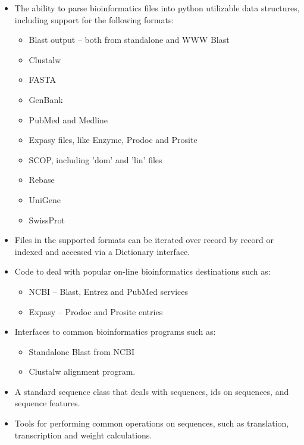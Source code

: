 \documentclass{report}
\begin{document}
\begin{itemize}
  \item The ability to parse bioinformatics files into python utilizable data structures, including support for the following formats:

  \begin{itemize}
    \item Blast output -- both from standalone and WWW Blast
    \item Clustalw
    \item FASTA
    \item GenBank
    \item PubMed and Medline
    \item Expasy files, like Enzyme, Prodoc and Prosite
    \item SCOP, including 'dom' and 'lin' files
    \item Rebase
    \item UniGene
    \item SwissProt
  \end{itemize}

  \item Files in the supported formats can be iterated over record by record or indexed and accessed via a Dictionary interface.

  \item Code to deal with popular on-line bioinformatics destinations such as:

  \begin{itemize}
    \item NCBI -- Blast, Entrez and PubMed services
    \item Expasy -- Prodoc and Prosite entries
  \end{itemize}

  \item Interfaces to common bioinformatics programs such as:

  \begin{itemize}
    \item Standalone Blast from NCBI
    \item Clustalw alignment program.
  \end{itemize}

  \item A standard sequence class that deals with sequences, ids on sequences, and sequence features.

  \item Tools for performing common operations on sequences, such as translation, transcription and weight calculations.


\end{itemize}
\end{document}
